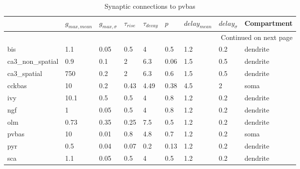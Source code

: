 \begin{longtable}{lllllllll}
\caption{Synaptic connections to pvbas}\label{pvbas_synapses}\\
\toprule
{} &  $g_{max, mean}$ & $g_{max, \sigma}$ & $\tau_{rise}$ & $\tau_{decay}$ &  $p$ & $delay_{mean}$ & $delay_{\sigma}$ & Compartment \\
\midrule
\endhead
\midrule
\multicolumn{9}{r}{{Continued on next page}} \\
\midrule
\endfoot

\bottomrule
\endlastfoot
bis             &   1.1 &     0.05 &      0.5 &         4 &   0.5 &   1.2 &       0.2 &      dendrite\ \\
ca3\_non\_spatial &   0.9 &      0.1 &        2 &       6.3 &  0.06 &   1.5 &       0.5 &      dendrite\ \\
ca3\_spatial     &   750 &      0.2 &        2 &       6.3 &   0.6 &   1.5 &       0.5 &      dendrite\ \\
cckbas          &    10 &      0.2 &     0.43 &      4.49 &  0.38 &   4.5 &         2 &               soma \\
ivy             &  10.1 &      0.5 &      0.5 &         4 &   0.8 &   1.2 &       0.2 &      dendrite\ \\
ngf             &     1 &     0.05 &      0.5 &         4 &   0.8 &   1.2 &       0.2 &      dendrite\ \\
olm             &  0.73 &     0.35 &     0.25 &       7.5 &   0.5 &   1.2 &       0.2 &      dendrite\ \\
pvbas           &    10 &     0.01 &      0.8 &       4.8 &   0.7 &   1.2 &       0.2 &               soma \\
pyr             &   0.5 &     0.04 &     0.07 &       0.2 &  0.13 &   1.2 &       0.2 &      dendrite\ \\
sca             &   1.1 &     0.05 &      0.5 &         4 &   0.5 &   1.2 &       0.2 &      dendrite\ \\
\end{longtable}
